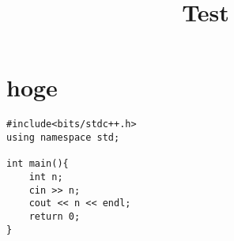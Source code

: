 \documentclass[12pt,a4paper,dvipdfmx]{jsarticle}
\title{Test}
\author{}
\date{}
\begin{document}
\maketitle

\section{hoge}

\begin{lstlisting}
#include<bits/stdc++.h>
using namespace std;

int main(){
    int n;
    cin >> n;
    cout << n << endl;
    return 0;
}
\end{lstlisting}
\end{document}
